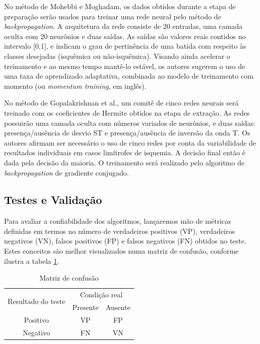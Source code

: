 No método de Mohebbi e Moghadam, os dados obtidos durante a etapa de preparação serão usados para treinar uma rede neural pelo método de \emph{backpropagation}. A arquitetura da rede consiste de 20 entradas, uma camada oculta com 20 neurônios e duas saídas. As saídas são valores reais contidos no intervalo [0,1], e indicam o grau de pertinência de uma batida com respeito às classes desejadas (isquêmica ou não-isquêmica). Visando ainda acelerar o treinamento e ao mesmo tempo mantê-lo estável, os autores sugerem o uso de uma taxa de aprendizado adaptativa, combinada ao modelo de treinamento com momento (ou \emph{momentum training}, em inglês).

No método de Gopalakrishnan et al., um comitê de cinco redes neurais será treinado com os coeficientes de Hermite obtidos na etapa de extração. As redes possuirão uma camada oculta com números variados de neurônios, e duas saídas: presença/ausência de desvio ST e presença/ausência de inversão da onda T. Os autores afirmam ser necessário o uso de cinco redes por conta da variabilidade de resultados individuais em casos limítrofes de isquemia. A decisão final então é dada pela decisão da maioria. O treinamento será realizado pelo algoritmo de \emph{backpropagation} de gradiente conjugado.

\subsection{Testes e Validação}
Para avaliar a confiabilidade dos algoritmos, lançaremos mão de métricas definidas em termos no número de verdadeiros positivos (VP), verdadeiros negativos (VN), falsos positivos (FP) e falsos negativos (FN) obtidos no teste. Estes conceitos são melhor visualizados numa matriz de confusão, conforme ilustra a tabela \ref{tab:confusion_matrix}.

\begin{table}[ht] 
    \caption{Matriz de confusão}
    \centering
    \begin{tabular}{ccc}
        \toprule
        \multirow{2}{2cm}{Resultado do teste} &
        \multicolumn{2}{c}{Condição real} \\
        \cmidrule{2-3}
        & Presente & Ausente \\ 
        \midrule
        Positivo & VP & FP \\
        \midrule
        Negativo & FN & VN \\
        \bottomrule
    \end{tabular} 
    \label{tab:confusion_matrix}
\end{table}

